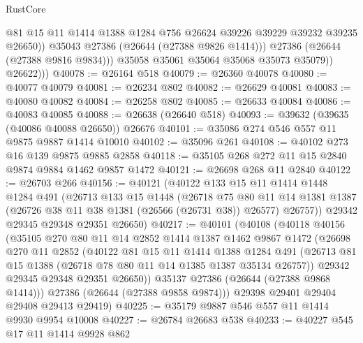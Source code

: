 \begin{lexlean}{RustCore}
\begin{coremodule}
                      @81
                      @15
                      @11
                      @1414
                      @1388
                      @1284
                      @756
                      @26624
                      @39226
                      @39229
                      @39232
                      @39235
                      @26650))
                  @35043
                  @27386
                  (@26644 (@27388 @9826 @1414)))
                @27386
                (@26644 (@27388 @9816 @9834)))
              @35058
              @35061
              @35064
              @35068
              @35073
              @35079))
          @26622)))
@40078 := @26164 @518
@40079 := @26360 @40078
@40080 := @40077 @40079
@40081 := @26234 @802
@40082 := @26629 @40081
@40083 := @40080 @40082
@40084 := @26258 @802
@40085 := @26633 @40084
@40086 := @40083 @40085
@40088 := @26638 (@26640 @518)
@40093 := @39632 (@39635 (@40086 @40088 @26650)) @26676
@40101 := @35086 @274 @546 @557 @11 @9875 @9887 @1414 @10010
@40102 := @35096 @261
@40108 := @40102 @273 @16 @139 @9875 @9885 @2858
@40118 := @35105 @268 @272 @11 @15 @2840 @9874 @9884 @1462 @9857 @1472
@40121 := @26698 @268 @11 @2840
@40122 := @26703 @266
@40156 := @40121
    (@40122
      @133
      @15
      @11
      @1414
      @1448
      @1284
      @491
      (@26713
        @133
        @15
        @1448
        (@26718
          @75
          @80
          @11
          @14
          @1381
          @1387
          (@26726 @38 @11 @38 @1381 (@26566 (@26731 @38)) @26577)
          @26757))
      @29342
      @29345
      @29348
      @29351
      @26650)
@40217 := @40101
    (@40108
      (@40118
        @40156
        (@35105
          @270
          @80
          @11
          @14
          @2852
          @1414
          @1387
          @1462
          @9867
          @1472
          (@26698
            @270
            @11
            @2852
            (@40122
              @81
              @15
              @11
              @1414
              @1388
              @1284
              @491
              (@26713 @81 @15 @1388 (@26718 @78 @80 @11 @14 @1385 @1387 @35134 @26757))
              @29342
              @29345
              @29348
              @29351
              @26650))
          @35137
          @27386
          (@26644 (@27388 @9868 @1414)))
        @27386
        (@26644 (@27388 @9858 @9874)))
      @29398
      @29401
      @29404
      @29408
      @29413
      @29419)
@40225 := @35179 @9887 @546 @557 @11 @1414 @9930 @9954 @10008
@40227 := @26784 @26683 @538
@40233 := @40227 @545 @17 @11 @1414 @9928 @862

\end{coremodule}
\end{lexlean}
